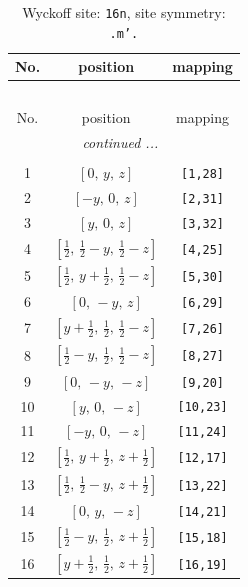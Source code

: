 \documentclass[fleqn,8pt]{jsarticle}
\begin{document}
\renewcommand{\arraystretch}{1.2}
\begin{longtable}{ccc}
\caption{Wyckoff site: {\tt 16n}, site symmetry: {\tt .m'.}}
 \\
 \hline \hline
No. & position & mapping \\ \hline \endfirsthead

\multicolumn{2}{l}{\tablename\ \thetable{}} \\
 \hline \hline
No. & position & mapping \\ \hline \endhead

 \hline \hline
\multicolumn{2}{r}{\footnotesize\it continued ...} \\ \endfoot

 \hline \hline
\multicolumn{2}{r}{} \\ \endlastfoot

1 & $\left[ 0,\, y,\, z \right]$ & {\tt [1,28]} \\ \hline
2 & $\left[ - y,\, 0,\, z \right]$ & {\tt [2,31]} \\ \hline
3 & $\left[ y,\, 0,\, z \right]$ & {\tt [3,32]} \\ \hline
4 & $\left[ \frac{1}{2},\, \frac{1}{2} - y,\, \frac{1}{2} - z \right]$ & {\tt [4,25]} \\ \hline
5 & $\left[ \frac{1}{2},\, y + \frac{1}{2},\, \frac{1}{2} - z \right]$ & {\tt [5,30]} \\ \hline
6 & $\left[ 0,\, - y,\, z \right]$ & {\tt [6,29]} \\ \hline
7 & $\left[ y + \frac{1}{2},\, \frac{1}{2},\, \frac{1}{2} - z \right]$ & {\tt [7,26]} \\ \hline
8 & $\left[ \frac{1}{2} - y,\, \frac{1}{2},\, \frac{1}{2} - z \right]$ & {\tt [8,27]} \\ \hline
9 & $\left[ 0,\, - y,\, - z \right]$ & {\tt [9,20]} \\ \hline
10 & $\left[ y,\, 0,\, - z \right]$ & {\tt [10,23]} \\ \hline
11 & $\left[ - y,\, 0,\, - z \right]$ & {\tt [11,24]} \\ \hline
12 & $\left[ \frac{1}{2},\, y + \frac{1}{2},\, z + \frac{1}{2} \right]$ & {\tt [12,17]} \\ \hline
13 & $\left[ \frac{1}{2},\, \frac{1}{2} - y,\, z + \frac{1}{2} \right]$ & {\tt [13,22]} \\ \hline
14 & $\left[ 0,\, y,\, - z \right]$ & {\tt [14,21]} \\ \hline
15 & $\left[ \frac{1}{2} - y,\, \frac{1}{2},\, z + \frac{1}{2} \right]$ & {\tt [15,18]} \\ \hline
16 & $\left[ y + \frac{1}{2},\, \frac{1}{2},\, z + \frac{1}{2} \right]$ & {\tt [16,19]} \\
\end{longtable}
\end{document}
